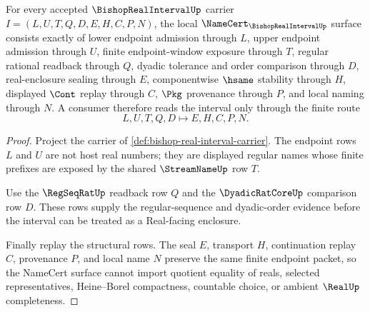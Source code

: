 \begin{theorem}
\label{thm:bishop-real-interval-namecert-obligations}
For every accepted $\BishopRealIntervalUp$ carrier $I=(L,U,T,Q,D,E,H,C,P,N)$, the local $\NameCert_{\BishopRealIntervalUp}$ surface consists exactly of lower endpoint admission through $L$, upper endpoint admission through $U$, finite endpoint-window exposure through $T$, regular rational readback through $Q$, dyadic tolerance and order comparison through $D$, real-enclosure sealing through $E$, componentwise $\hsame$ stability through $H$, displayed $\Cont$ replay through $C$, $\Pkg$ provenance through $P$, and local naming through $N$. A consumer therefore reads the interval only through the finite route
$$
L,U,T,Q,D \longmapsto E,H,C,P,N .
$$
\end{theorem}
\begin{proof}
Project the carrier of \autoref{def:bishop-real-interval-carrier}. The endpoint rows $L$ and $U$ are not host real numbers; they are displayed regular names whose finite prefixes are exposed by the shared $\StreamNameUp$ row $T$.

Use the $\RegSeqRatUp$ readback row $Q$ and the $\DyadicRatCoreUp$ comparison row $D$. These rows supply the regular-sequence and dyadic-order evidence before the interval can be treated as a Real-facing enclosure.

Finally replay the structural rows. The seal $E$, transport $H$, continuation replay $C$, provenance $P$, and local name $N$ preserve the same finite endpoint packet, so the NameCert surface cannot import quotient equality of reals, selected representatives, Heine--Borel compactness, countable choice, or ambient $\RealUp$ completeness.
\end{proof}


